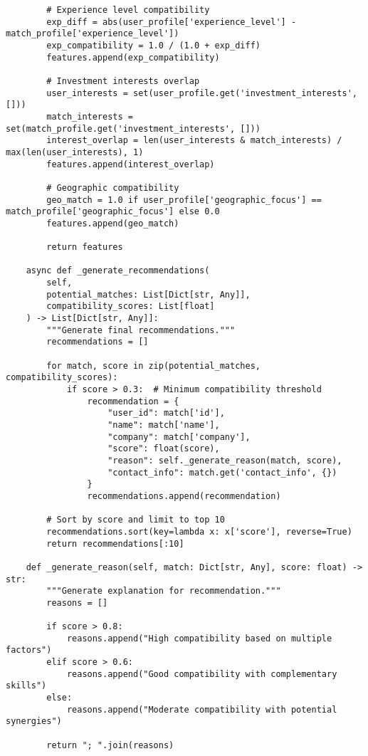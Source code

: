 \begin{verbatim}
        # Experience level compatibility
        exp_diff = abs(user_profile['experience_level'] - match_profile['experience_level'])
        exp_compatibility = 1.0 / (1.0 + exp_diff)
        features.append(exp_compatibility)
        
        # Investment interests overlap
        user_interests = set(user_profile.get('investment_interests', []))
        match_interests = set(match_profile.get('investment_interests', []))
        interest_overlap = len(user_interests & match_interests) / max(len(user_interests), 1)
        features.append(interest_overlap)
        
        # Geographic compatibility
        geo_match = 1.0 if user_profile['geographic_focus'] == match_profile['geographic_focus'] else 0.0
        features.append(geo_match)
        
        return features
    
    async def _generate_recommendations(
        self, 
        potential_matches: List[Dict[str, Any]], 
        compatibility_scores: List[float]
    ) -> List[Dict[str, Any]]:
        """Generate final recommendations."""
        recommendations = []
        
        for match, score in zip(potential_matches, compatibility_scores):
            if score > 0.3:  # Minimum compatibility threshold
                recommendation = {
                    "user_id": match['id'],
                    "name": match['name'],
                    "company": match['company'],
                    "score": float(score),
                    "reason": self._generate_reason(match, score),
                    "contact_info": match.get('contact_info', {})
                }
                recommendations.append(recommendation)
        
        # Sort by score and limit to top 10
        recommendations.sort(key=lambda x: x['score'], reverse=True)
        return recommendations[:10]
    
    def _generate_reason(self, match: Dict[str, Any], score: float) -> str:
        """Generate explanation for recommendation."""
        reasons = []
        
        if score > 0.8:
            reasons.append("High compatibility based on multiple factors")
        elif score > 0.6:
            reasons.append("Good compatibility with complementary skills")
        else:
            reasons.append("Moderate compatibility with potential synergies")
        
        return "; ".join(reasons)
\end{verbatim}

